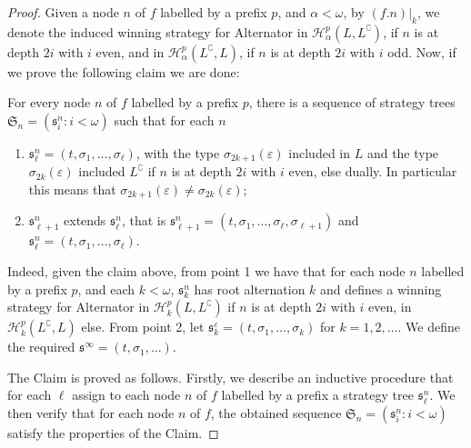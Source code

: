 \begin{proof}
Given a node $n$ of $f$ labelled by a prefix $p$, and $\alpha < \omega$,  by $(f.n)|_k$, we denote the induced  winning strategy  for Alternator in  $\mathcal{H}^p_\alpha(L, L^\complement)$, if $n$ is at depth $2i$ with $i$ even, and in  $\mathcal{H}^p_\alpha(L^\complement, L)$, if $n$ is at depth $2i$ with $i$ odd.
Now, if we prove the following claim we are done:
\begin{claim}\label{claim:strategy}
For every node $n$ of $f$ labelled by a prefix $p$, 
there is a sequence of strategy trees $\mathfrak{S}_n=(\mathfrak{s}^n_i: i < \omega)$ such that for each $n$
\begin{enumerate}
\item $\mathfrak{s}^n_\ell=(t, \sigma_1, \dots, \sigma_\ell)$, with the type $\sigma_{2k+1}(\varepsilon)$ included in $L$ and the type  $\sigma_{2k}(\varepsilon)$ included  $L^\complement$ if $n$ is at depth $2i$ with $i$ even, else dually. In particular this means that  $\sigma_{2k+1}(\varepsilon) \neq \sigma_{2k}(\varepsilon)$;
\item $\mathfrak{s}^n_{\ell+1}$ extends $\mathfrak{s}^n_\ell$, that is  $\mathfrak{s}^n_{\ell+1}=(t, \sigma_1, \dots, \sigma_\ell, \sigma_{\ell+1})$ and $\mathfrak{s}^n_\ell=(t, \sigma_1, \dots, \sigma_\ell)$.
\end{enumerate}
\end{claim}
Indeed, given the claim above, from point 1 we have that
for each node $n$ labelled by a prefix $p$, and each $k < \omega$, $\mathfrak{s}^n_k$ has root alternation $k$ and defines a winning strategy for Alternator in $\mathcal{H}^p_k(L, L^\complement)$ if $n$ is at depth $2i$ with $i$ even, in $\mathcal{H}^p_k(L^\complement, L)$ else.
From point 2, let $\mathfrak{s}^\varepsilon_k = (t, \sigma_1, \dots, \sigma_k)$ for $k=1,2,\dots$. We define  
the required $\mathfrak{s}^\infty = (t, \sigma_1, \dots )$.

The Claim  is proved as follows. 
Firstly, we describe an inductive procedure that for each $\ell$ assign to each node $n$ of $f$ labelled by a prefix a strategy tree $\mathfrak{s}^n_\ell$.
We then verify that for each node $n$ of $f$, the obtained sequence $\mathfrak{S}_n=(\mathfrak{s}^n_i: i < \omega)$ satisfy
the properties of the Claim. 


\end{proof}

